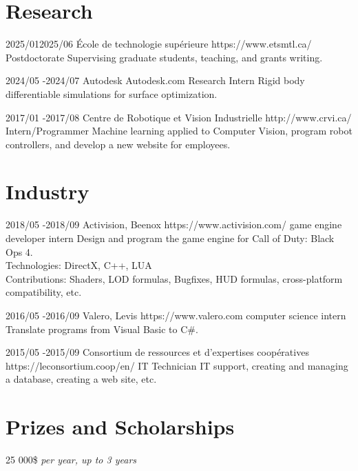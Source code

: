 \documentclass[10pt]{article} %
\begin{document}
\section{Research}
\job
{2025/01}{2025/06}
{École de technologie supérieure}
{https://www.etsmtl.ca/}
{Postdoctorate}
{Supervising graduate students, teaching, and grants writing.}


\job
{2024/05 -}{2024/07}
{Autodesk}
{Autodesk.com}
{Research Intern}
{Rigid body differentiable simulations for surface optimization.}

\job
{2017/01 -}{2017/08}
{Centre de Robotique et Vision Industrielle}
{http://www.crvi.ca/}
{Intern/Programmer}
{Machine learning applied to Computer Vision, program robot controllers, and develop a new website for employees.}

\section{Industry}

\job
{2018/05 -}{2018/09}
{Activision, Beenox}
{https://www.activision.com/}
{game engine developer intern}
{Design and program the game engine for Call of Duty: Black Ops 4.\\
 Technologies: DirectX, C++, LUA \\
 Contributions: Shaders, LOD formulas, Bugfixes, HUD formulas, cross-platform compatibility, etc.}

\job
{2016/05 -}{2016/09}
{Valero, Levis}
{https://www.valero.com}
{computer science intern}
{Translate programs from Visual Basic to C\#.}

\job
{2015/05 -}{2015/09}
{Consortium de ressources et d'expertises coopératives}
{https://leconsortium.coop/en/}
{IT Technician}
{IT support, creating and managing a database, creating a web site, etc.}


\section{Prizes and Scholarships}

{
 25 000\$ \textit{per year, up to 3 years} \\
}
\end{document}
